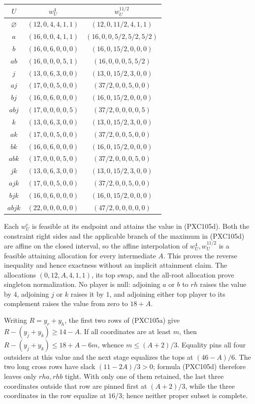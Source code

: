 \documentclass[11pt]{article}
\begin{document}
\begin{center}
\scriptsize
\begin{tabular}{c|c|c}
\(U\)&\(w^4_U\)&\(w^{11/2}_U\)\\ \hline
\(\varnothing\)&\((12,0,4,4,1,1)\)&\((12,0,11/2,4,1,1)\)\\
\(a\)&\((16,0,0,4,1,1)\)&\((16,0,0,5/2,5/2,5/2)\)\\
\(b\)&\((16,0,6,0,0,0)\)&\((16,0,15/2,0,0,0)\)\\
\(ab\)&\((16,0,0,0,5,1)\)&\((16,0,0,0,5,5/2)\)\\
\(j\)&\((13,0,6,3,0,0)\)&\((13,0,15/2,3,0,0)\)\\
\(aj\)&\((17,0,0,5,0,0)\)&\((37/2,0,0,5,0,0)\)\\
\(bj\)&\((16,0,6,0,0,0)\)&\((16,0,15/2,0,0,0)\)\\
\(abj\)&\((17,0,0,0,0,5)\)&\((37/2,0,0,0,0,5)\)\\
\(k\)&\((13,0,6,3,0,0)\)&\((13,0,15/2,3,0,0)\)\\
\(ak\)&\((17,0,0,5,0,0)\)&\((37/2,0,0,5,0,0)\)\\
\(bk\)&\((16,0,6,0,0,0)\)&\((16,0,15/2,0,0,0)\)\\
\(abk\)&\((17,0,0,0,5,0)\)&\((37/2,0,0,0,5,0)\)\\
\(jk\)&\((13,0,6,3,0,0)\)&\((13,0,15/2,3,0,0)\)\\
\(ajk\)&\((17,0,0,5,0,0)\)&\((37/2,0,0,5,0,0)\)\\
\(bjk\)&\((16,0,6,0,0,0)\)&\((16,0,15/2,0,0,0)\)\\
\(abjk\)&\((22,0,0,0,0,0)\)&\((47/2,0,0,0,0,0)\)
\end{tabular}
\end{center}

Each \(w^e_U\) is feasible at its endpoint and attains the value in
(PXC105d).  Both the constraint right sides and the applicable branch of
the maximum in (PXC105d) are affine on the closed interval, so the affine
interpolation of \(w^4_U,w^{11/2}_U\) is a feasible attaining allocation for
every intermediate \(A\).  This proves the reverse inequality and hence
exactness without an implicit attainment claim.  The allocations
\((0,12,A,4,1,1)\), its top swap, and the all-root allocation prove singleton
normalization.  No player is null: adjoining \(a\) or \(b\) to \(rh\) raises
the value by \(4\), adjoining \(j\) or \(k\) raises it by \(1\), and adjoining
either top player to its complement raises the value from zero to \(18+A\).

Writing \(R=y_r+y_h\), the first two rows of (PXC105a) give
\(R-(y_j+y_k)\ge14-A\).  If all coordinates are at least \(m\), then
\(R-(y_j+y_k)\le18+A-6m\), whence \(m\le(A+2)/3\).  Equality pins all
four outsiders at this value and the next stage equalizes the tops at
\((46-A)/6\).  The two long cross rows have slack
\((11-2A)/3>0\); formula (PXC105d) therefore leaves only \(rha,rhb\)
tight.  With only one of them retained, the last three coordinates outside
that row are pinned first at \((A+2)/3\), while the three coordinates in
the row equalize at \(16/3\); hence neither proper subset is complete.
\end{document}
